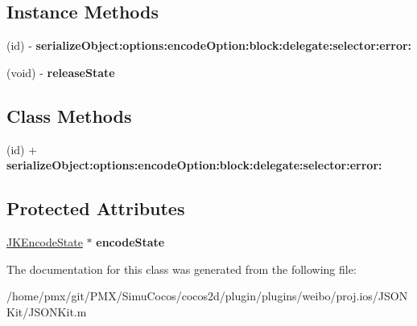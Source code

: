 \subsection*{Instance Methods}
\begin{DoxyCompactItemize}
\item 
\mbox{\label{interfaceJKSerializer_af3e10179be6213c67d42060ed230bd5a}} 
(id) -\/ {\bfseries serialize\+Object\+:options\+:encode\+Option\+:block\+:delegate\+:selector\+:error\+:}
\item 
\mbox{\label{interfaceJKSerializer_a1149913af74980381131cdccf0da8545}} 
(void) -\/ {\bfseries release\+State}
\end{DoxyCompactItemize}
\subsection*{Class Methods}
\begin{DoxyCompactItemize}
\item 
\mbox{\label{interfaceJKSerializer_af3e10179be6213c67d42060ed230bd5a}} 
(id) + {\bfseries serialize\+Object\+:options\+:encode\+Option\+:block\+:delegate\+:selector\+:error\+:}
\end{DoxyCompactItemize}
\subsection*{Protected Attributes}
\begin{DoxyCompactItemize}
\item 
\mbox{\label{interfaceJKSerializer_a194502e1f78000add993592a219b5fd7}} 
\hyperlink{structJKEncodeState}{J\+K\+Encode\+State} $\ast$ {\bfseries encode\+State}
\end{DoxyCompactItemize}


The documentation for this class was generated from the following file\+:\begin{DoxyCompactItemize}
\item 
/home/pmx/git/\+P\+M\+X/\+Simu\+Cocos/cocos2d/plugin/plugins/weibo/proj.\+ios/\+J\+S\+O\+N\+Kit/J\+S\+O\+N\+Kit.\+m\end{DoxyCompactItemize}
